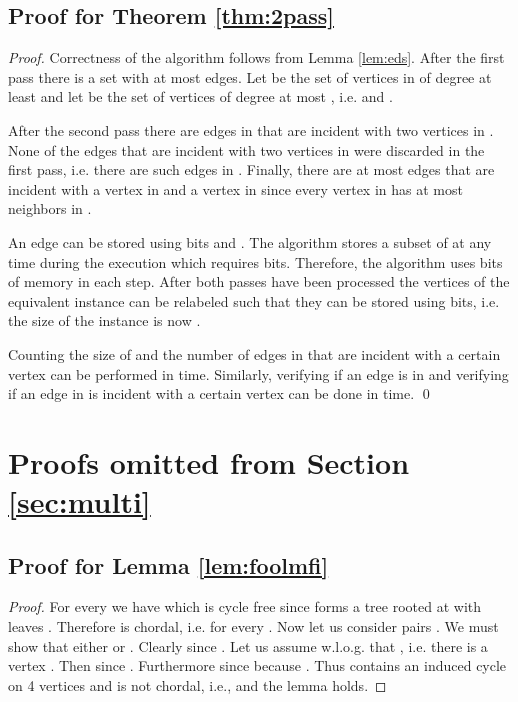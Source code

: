 \documentclass[draft,a4paper]{llncs}
\begin{document}
\subsection{Proof for Theorem \ref{thm:2pass}}

\begin{proof}
 Correctness of the algorithm follows from Lemma \ref{lem:eds}. After the first pass there is a set  with at most
  edges. Let  be the set of vertices in  of degree at least  and let  be the set of vertices of degree at most , i.e.  and .
 
 After the second pass there are  edges in  that are incident with two vertices in . None of the edges that are incident with two vertices in  were discarded in the first pass, i.e. there are  such edges in . Finally, there are at most  edges that are incident with a vertex in  and a vertex in  since every vertex in  has at most  neighbors in .
 
 An edge can be stored using  bits and  . The algorithm stores a subset of  at any time during the execution which requires  bits. Therefore, the algorithm uses  bits of memory in each step. After both passes have been processed the vertices of the equivalent instance can be relabeled such that they can be stored using  bits, i.e. the size of the instance is now . 
 
 Counting the size of  and the number of edges in  that are incident with a certain vertex  can be performed in  time. Similarly, verifying if an edge is in  and verifying if an edge in  is incident with a certain vertex  can be done in  time.
  \qed \end{proof}
  
\section{Proofs omitted from Section \ref{sec:multi}}
\subsection{Proof for Lemma \ref{lem:foolmfi}}

\begin{proof}
For every  we have  which is cycle free since  forms a tree rooted at  with leaves . Therefore  is chordal, i.e.  for every . Now let us consider pairs . We must show that either  or . Clearly  since . Let us assume w.l.o.g. that , i.e. there is a vertex . Then  since . Furthermore  since  because . Thus  contains an induced cycle on 4 vertices and is not chordal, i.e.,  and the lemma holds.
\end{proof}
\end{document}
